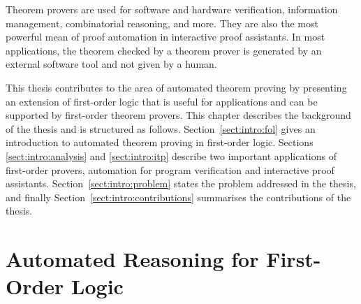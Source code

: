 {Theorem provers are used for software and hardware verification, information management, combinatorial reasoning, and more. They are also the most powerful mean of proof automation in interactive proof assistants. In most applications, the theorem checked by a theorem prover is generated by an external software tool and not given by a human. %

This thesis contributes to the area of automated theorem proving by presenting an extension of first-order logic that is useful for applications and can be supported by first-order theorem provers. This chapter describes the background of the thesis and is structured as follows. Section~\ref{sect:intro:fol} gives an introduction to automated theorem proving in first-order logic. Sections \ref{sect:intro:analysis} and \ref{sect:intro:itp} describe two important applications of first-order provers, automation for program verification and interactive proof assistants. Section~\ref{sect:intro:problem} states the problem addressed in the thesis, and finally Section~\ref{sect:intro:contributions} summarises the contributions of the thesis.
}

\section*{Automated Reasoning for First-Order Logic}

